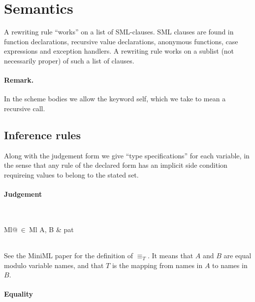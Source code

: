 
\section{Semantics}
A rewriting rule ``works'' on a list of SML-clauses. SML clauses are found in
function declarations, recursive value declarations, anonymous functions, case
expressions and exception handlers. A rewriting rule works on a sublist (not
necessarily proper) of such a list of clauses.

\paragraph{Remark.} In the scheme bodies we allow the keyword \textsf{self},
which we take to mean a recursive call.

\subsection{Inference rules}
\def\TheTrueColour{NavyBlue}
\newcommand{\becomesthrough}[3]{\ensuremath{#1}\textsf{\color{\TheTrueColour}\ becomes\ }\ensuremath{#2}\textsf{\color{\TheTrueColour}\ through\ }\ensuremath{#3}}

Along with the judgement form we give ``type specifications'' for each variable,
in the sense that any rule of the declared form has an implicit side condition
requireing values to belong to the stated set.


\paragraph{Judgement} \\
\indent\begin{tabular}{Ml@{$\ \in\ $}Ml}
  A, B & pat
\end{tabular}\\

See the MiniML paper for the definition of $\equiv_T$. It means that $A$ and $B$
are equal modulo variable names, and that $T$ is the mapping from names in $A$
to names in $B$.


\paragraph{Equality}

